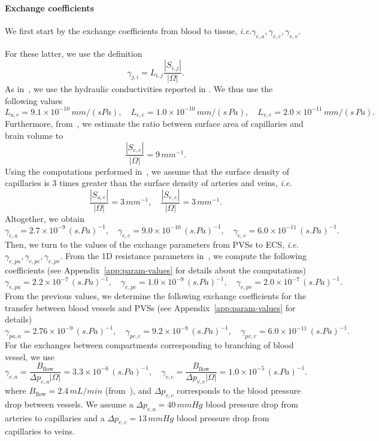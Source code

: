 \documentclass[10pt]{article}
\newcommand{\ie}{\emph{i.e.}\;}
\newcommand{\1}{^{(1)}}
\newcommand{\2}{^{(2)}}
\newcommand{\abs}[1]{\left\lvert#1\right\rvert}
\begin{document}
\paragraph{Exchange coefficients}
\begin{sloppypar}
We first start by the exchange coefficients from blood to tissue, \ie ${\gamma_{e, a}, \gamma_{e, c}, \gamma_{e, v}}$. 
\end{sloppypar}
For these latter, we use the definition
\[
    \gamma_{j, i} = L_{i,j} \frac{\abs{S_{i,j}}}{\abs{\Omega}}. 
\]
As in~\cite{shi-2014-Quantification}, we use the hydraulic conductivities reported in \cite{fraser1990measurement, kimura1993measurement, roberts2009ppar}. We thus use the following values  
\[
    L_{a,e} = 9.1 \times 10^{-10} \,\si{mm/(s Pa)},\quad L_{c,e} = 1.0\times 10^{-10}\, \si{mm/(s\,Pa)},\quad L_{v,e} = 2.0 \times 10^{-11} \,\si{mm/(s\,Pa)}.
\]
Furthermore, from~\cite{smith2007interstitial}, we estimate the ratio between surface area of capillaries and brain volume to 
\[
    \frac{\abs{S_{c,e}}}{\abs{\Omega}} =   9 \, \si{mm^{-1}}.
\]
Using the computations performed in~\cite{el-bouri-conferencepaper}, we assume that the surface density of capillaries is 3 times greater than the surface density of arteries and veins, \ie
\[
\frac{\abs{S_{a,e}}}{\abs{\Omega}} =   3 \, \si{mm^{-1}},\quad \frac{\abs{S_{v,e}}}{\abs{\Omega}} =   3 \, \si{mm^{-1}}.
\]
Altogether, we obtain 
\[
\gamma_{e , a} = 2.7 \times 10^{-9} \,\si{(s.Pa)^{-1} },\quad  \gamma_{e, c} =9.0 \times 10^{-10} \,\si{(s.Pa)^{-1} },\quad  \gamma_{e, v} = 6.0  \times 10^{-11} \,\si{(s.Pa)^{-1}}.
\]
Then, we turn to the values of the exchange parameters from PVSs to ECS, \ie $\gamma_{e, pa}, \gamma_{e, pc}, \gamma_{e, pv}$. From the 1D resistance parameters in~\cite{Vinje-2020-ICP}, we compute the following coefficients (see Appendix~\ref{app:param-values} for details about the computations) 
\[
\gamma_{e , pa} = 2.2 \times 10^{-7} \,\si{(s.Pa)^{-1} },\quad  \gamma_{e, pc} = 1.0 \times 10^{-9} \,\si{(s.Pa)^{-1} },\quad  \gamma_{e, pv} = 2.0 \times 10^{-7} \,\si{(s.Pa)^{-1} }.
\]
From the previous values, we determine the following exchange coefficients for the transfer between blood vessels and PVSs (see Appendix~\ref{app:param-values} for details)
\[ 
\gamma_{pa , a} = 2.76\times 10^{-9} \,\si{(s.Pa)^{-1} },\quad  \gamma_{pc, c} = 9.2 \times 10^{-9} \,\si{(s.Pa)^{-1} },\quad  \gamma_{pv, v} = 6.0 \times 10^{-11} \,\si{(s.Pa)^{-1} }.
\]
For the exchanges between compartments corresponding to branching of blood vessel, we use  
\[
    \gamma_{c , a} =  \frac{B_\text{flow}}{ \Delta p_{c , a} \abs{\Omega}} = 3.3 \times 10^{-6} \,\si{(s.Pa)^{-1}}, \quad  \gamma_{v , c} =  \frac{B_\text{flow}}{\Delta p_{v , c} \abs{\Omega}} = 1.0 \times 10^{-5}\,\si{(s.Pa)^{-1}}.
\]
where $B_\text{flow} = 2.4 \, \si{mL/min} $ (from~\cite{Muir-2008-CBF}), and $\Delta p_{v , c}$ corresponds to the blood pressure drop between vessels. We assume a $\Delta p_{c , a} = 40 \,\si{mmHg}$ blood pressure drop from arteries to capillaries and a $\Delta p_{v , c} = 13 \, \si{mmHg}$ blood pressure drop from capillaries to veins. 
\end{document}
